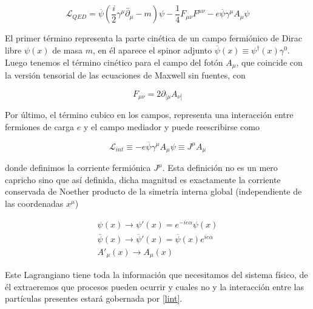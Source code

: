 \documentclass[tickz]{article}
\numberwithin{equation}{section}
\begin{document}
\begin{equation}\label{lqed}
\mathscr{L}_{QED}=\overline{\psi}\left(\frac{i}{2}\gamma^{\mu}
\overleftrightarrow{\partial_{\mu}}-m\right)\psi-\frac{1}{4}F_{\mu\nu}F^{\mu\nu}-e\overline{\psi}\gamma^{\mu}A_{\mu}\psi
\end{equation}

El primer término representa la parte cinética de un campo fermiónico de Dirac libre $ \psi(x) $ de masa $ m $, en él aparece el spinor adjunto $ \overline{\psi}(x)\equiv\psi^{\dagger}(x) \gamma^0 $. Luego tenemos el término cinético para el campo del fotón $ A_{\mu} $, que coincide con la versión tensorial de las ecuaciones de Maxwell sin fuentes, con

\begin{equation*}
F_{\mu\nu} = 2 \partial_{[\mu}A_{\nu]}
\end{equation*}


Por último, el término cubico en los campos, representa
una interacción entre fermiones de carga $ e $ y el campo mediador y puede reescribirse como

\begin{equation}\label{lint}
\mathscr{L}_{int}\equiv-e\overline{\psi}\gamma^{\mu}A_{\mu}\psi\equiv J^{\mu}A_{\mu}
\end{equation}

donde definimos la corriente fermiónica $J^{\mu}$. Esta definición no es un mero capricho sino que así definida, dicha magnitud es exactamente la corriente conservada de Noether producto de la simetría interna global (independiente de las coordenadas $ x^{\mu} $)

\begin{equation*}
\begin{aligned}
\psi(x) \longrightarrow \psi'(x)=e^{-ie\alpha}\psi(x)\\
\bar{\psi}(x) \longrightarrow \overline{\psi}'(x)=\overline{\psi}(x)e^{ie\alpha}\\
A'_{\mu}(x) \longrightarrow A_{\mu}(x) 
\end{aligned}
\end{equation*}

Este Lagrangiano tiene toda la información que necesitamos
del sistema físico, de él extraeremos que procesos pueden
ocurrir y cuales no y la interacción entre las partículas presentes estará gobernada por \ref{lint}.\\
\end{document}
